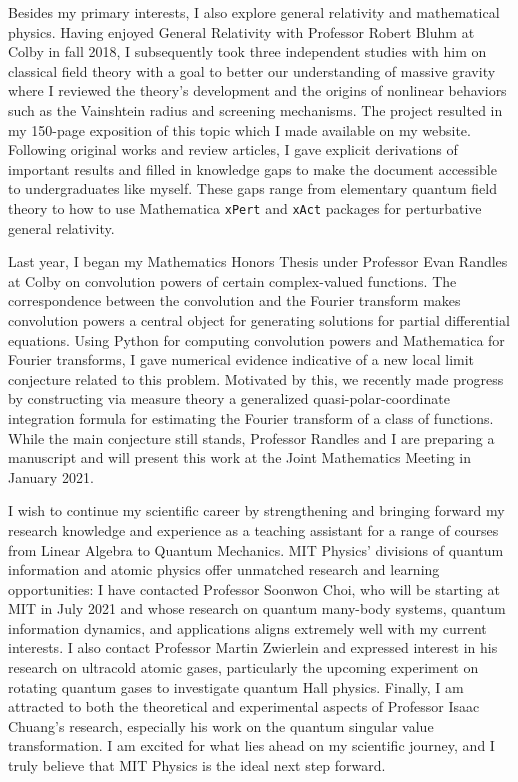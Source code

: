 \documentclass[12pt]{article}
\begin{document}
Besides my primary interests, I also explore general relativity and mathematical physics. Having enjoyed General Relativity with Professor Robert Bluhm at Colby in fall 2018, I subsequently took three independent studies with him on classical field theory with a goal to better our understanding of massive gravity where I reviewed the theory's development and the origins of nonlinear behaviors such as the Vainshtein radius and screening mechanisms. The project resulted in my 150-page exposition of this topic which I made available on my website. Following original works and review articles, I gave explicit derivations of important results and filled in knowledge gaps to make the document accessible to undergraduates like myself. These gaps range from elementary quantum field theory to how to use Mathematica \texttt{xPert} and \texttt{xAct} packages for perturbative general relativity. \\ \vspace{-10pt}

Last year, I began my Mathematics Honors Thesis under Professor Evan Randles at Colby on convolution powers of certain complex-valued functions. The correspondence between the convolution and the Fourier transform makes convolution powers a central object for generating solutions for partial differential equations. Using Python for computing convolution powers and Mathematica for Fourier transforms, I gave numerical evidence indicative of a new local limit conjecture related to this problem. Motivated by this, we recently made progress by constructing via measure theory a generalized quasi-polar-coordinate integration formula for estimating the Fourier transform of a class of functions. While the main conjecture still stands, Professor Randles and I are preparing a manuscript and will present this work at the Joint Mathematics Meeting in January 2021. \\ \vspace{-10pt}

I wish to continue my scientific career by strengthening and bringing forward my research knowledge and experience as a teaching assistant for a range of courses from Linear Algebra to Quantum Mechanics. MIT Physics' divisions of quantum information and atomic physics offer unmatched research and learning opportunities: I have contacted Professor Soonwon Choi, who will be starting at MIT in July 2021 and whose research on quantum many-body systems, quantum information dynamics, and applications aligns extremely well with my current interests. I also contact Professor Martin Zwierlein and expressed interest in his research on ultracold atomic gases, particularly the upcoming experiment on rotating quantum gases to investigate quantum Hall physics. Finally, I am attracted to both the theoretical and experimental aspects of Professor Isaac Chuang's research, especially his work on the quantum singular value transformation. I am excited for what lies ahead on my scientific journey, and I truly believe that MIT Physics is the ideal next step forward.   \\ 
\end{document}
